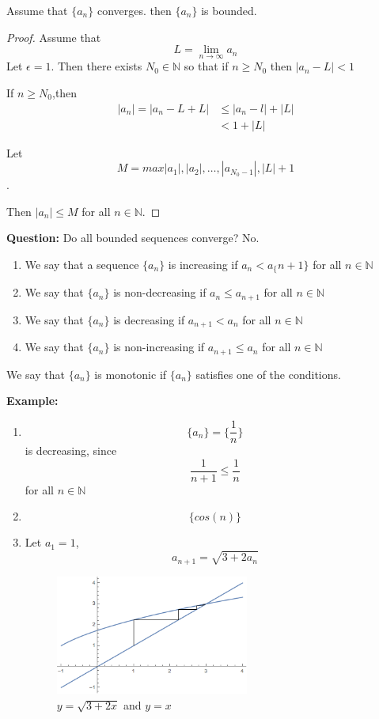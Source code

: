

\begin{thm}
Assume that $\{a_n\}$ converges. then $\{a_n\}$  is bounded.
\end{thm}

\begin{proof}
Assume that $$L = \lim_{n\to \infty} a_n$$
Let $\epsilon = 1$. Then there exists $N_0 \in \mathbb{N}$ so that if $n\geq N_0$ then $|a_n-L|<1$

If $n\geq N_0$,then \begin{align*}
    |a_n|=|a_n-L+L| &\leq |a_n-l|+|L|\\
    & < 1+|L|
\end{align*}

Let $$M = max {|a_1|,|a_2|,\dots ,|a_{N_0-1}|,|L|+1}$$.

Then $|a_n|\leq M$ for all $n\in \mathbb{N}$.
\end{proof}

\textbf{Question: }Do all bounded sequences converge? \hfill No.

\begin{defn}
\begin{enumerate}
    \item We say that a sequence $\{a_n\}$ is increasing if $a_n<a_\{n+1\}$ for all $n\in \mathbb{N}$
    \item We say that $\{a_n\}$ is non-decreasing if $a_n\leq a_{n+1}$ for all $n\in \mathbb{N}$
    \item We say that $\{a_n\}$ is decreasing if $a_{n+1} <a_n$ for all $n\in \mathbb{N}$
    \item We say that $\{a_n\}$ is non-increasing if $a_{n+1} \leq a_n$ for all $n\in \mathbb{N}$
\end{enumerate}

We say that $\{a_n\}$ is monotonic if $\{a_n\}$ satisfies one of the conditions.
\end{defn}

\textbf{Example: }
\begin{enumerate}
\item
$$\{a_n\} = \{\frac{1}{n}\}$$
is decreasing, since $$\frac{1}{n+1}\leq \frac{1}{n}$$ for all $n\in \mathbb{N}$
\item $$\{cos(n)\}$$
\item Let $a_1=1$,$$a_{n+1} = \sqrt{3+2a_n}$$


\begin{figure}[ht]
\centering
\includegraphics[width=0.6\textwidth]{picture/1.png}
\caption{$y=\sqrt{3+2x}$ and $y=x$}
\end{figure}

\end{enumerate}

